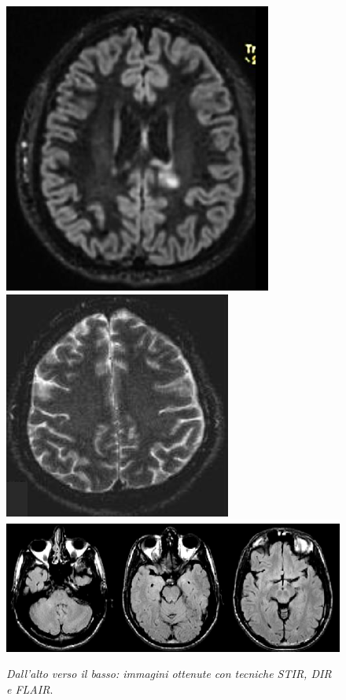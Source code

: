 \documentclass{report}
\numberwithin{equation}{section}
\numberwithin{figure}{section}
\begin{document}
\begin{figure}[htp]
\centering
\includegraphics[scale=0.7]{immagini/dir.png}\quad\includegraphics[scale=0.896]{immagini/stir.png}\quad\includegraphics[scale=0.9]{immagini/flair2.png}
\caption{\label{fig:flair2} \textit{Dall'alto verso il basso: immagini ottenute con tecniche STIR, DIR e FLAIR}.}
\end{figure}
\end{document}
